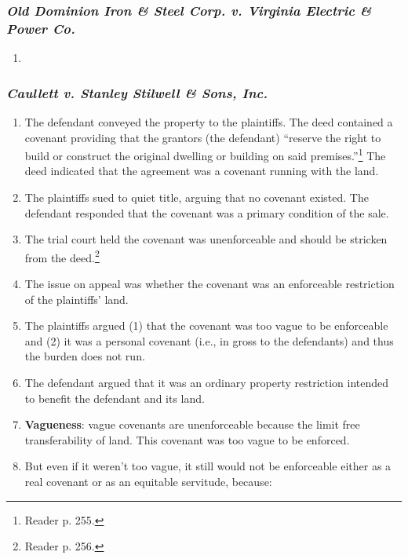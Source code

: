 \subsubsection{\emph{Old Dominion Iron \& Steel Corp. v. Virginia Electric \& 
Power Co.}}

\begin{enumerate}
    \item %
\end{enumerate}

\subsubsection{\emph{Caullett v. Stanley Stilwell \& Sons, Inc.}}

\begin{enumerate}
    \item The defendant conveyed the property to the plaintiffs. The deed 
    contained a covenant providing that the grantors (the defendant) ``reserve 
    the right to build or construct the original dwelling or building on said 
    premises.''\footnote{Reader p. 255.} The deed indicated that the agreement 
    was a covenant running with the land.
    \item The plaintiffs sued to quiet title, arguing that no covenant 
    existed. The defendant responded that the covenant was a primary condition 
    of the sale.
    \item The trial court held the covenant was unenforceable and should be 
    stricken from the deed.\footnote{Reader p. 256.}
    \item The issue on appeal was whether the covenant was an enforceable 
    restriction of the plaintiffs' land.
    \item The plaintiffs argued (1) that the covenant was too vague to be 
    enforceable and (2) it was a personal covenant (i.e., in gross to the 
    defendants) and thus the burden does not run.
    \item The defendant argued that it was an ordinary property restriction 
    intended to benefit the defendant and its land.
    \item \textbf{Vagueness}: vague covenants are unenforceable because the 
    limit free transferability of land. This covenant was too vague to be 
    enforced.
    \item But even if it weren't too vague, it still would not be enforceable 
    either as a real covenant or as an equitable servitude, because:
    \begin{enumerate}

\end{enumerate}
\end{enumerate}

